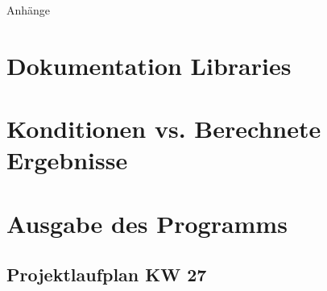 %
%
%
\begin{appendix}

\newpage

\begin{center}
	\huge{Anhänge}
\end{center}

\normalsize

\section{Dokumentation Libraries}
\label{documentation_libs}


\newpage
\section{Konditionen vs. Berechnete Ergebnisse}
\label{cond_vs_results}


\newpage
\section{Ausgabe des Programms}
\label{output_program}



\newpage
\begin{landscape}
	\section{Projektlaufplan KW 27}
	\label{sec:projectplan}
	\scalebox{.75}{
		
		}
\end{landscape}


\end{appendix}
